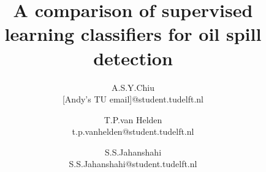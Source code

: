 \documentclass{article}
\title{\vspace{-15mm}\fontsize{18pt}{10pt}\selectfont\textbf{A comparison of supervised learning classifiers for oil spill detection}} %
\author{
A.S.Y.Chiu \\ \scriptsize{[Andy's TU email]@student.tudelft.nl}  \and
     \and T.P.van Helden \\ \scriptsize{t.p.vanhelden@student.tudelft.nl}
   \and S.S.Jahanshahi\\ \scriptsize{S.S.Jahanshahi@student.tudelft.nl}
}
\date{}
\begin{document}
\maketitle %

\thispagestyle{fancy} %


\begin{abstract}

  


\end{abstract}

\end{document}
